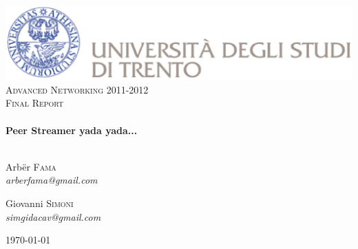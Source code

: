 \begin{titlepage}

\begin{center}

\includegraphics[scale=0.4]{figures/logo}\\[1cm]

\textsc{\LARGE Advanced Networking 2011-2012}\\[1.5cm]

\textsc{\Large Final Report}\\[0.5cm]

\HRule \\[0.5cm]
{\huge \bfseries Peer Streamer yada yada...}\\[0.5cm]
\HRule \\[1.5cm]

\begin{minipage}{0.4\textwidth}
\begin{flushleft} \large
Arb\"er \textsc{Fama}\\
\emph{arberfama@gmail.com}
\end{flushleft}
\end{minipage}
\begin{minipage}{0.4\textwidth}
\begin{flushright} \large
Giovanni \textsc{Simoni} \\
\emph{simgidacav@gmail.com}
\end{flushright}
\end{minipage}

\vfill

{\large \today}

\end{center}

\end{titlepage}
